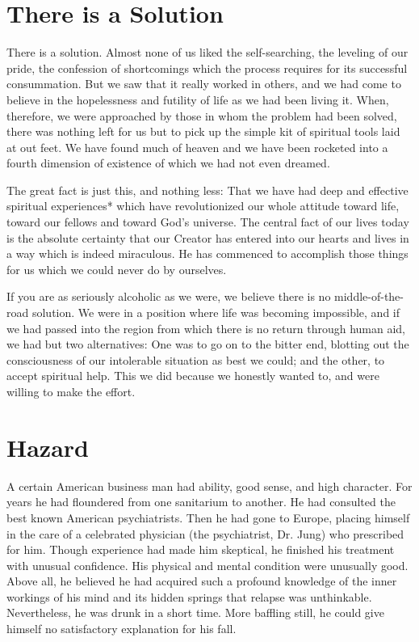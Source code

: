 \section{There is a Solution}

There is a solution. 
Almost none of us liked the self-searching, 
the leveling of our pride, the confession of shortcomings 
which the process requires for its successful consummation. 
But we saw that it really worked in others, 
and we had come to believe in the hopelessness and futility of life as we had been living it. 
When, therefore, we were approached by those in whom the problem had been solved, 
there was nothing left for us but to pick up the simple kit of spiritual tools laid at out feet. 
We have found much of heaven 
and we have been rocketed into a fourth dimension of existence of which we had not even dreamed.

The great fact is just this, and nothing less: 
That we have had deep and effective spiritual experiences* 
which have revolutionized our whole attitude toward life, 
toward our fellows 
and toward God's universe. 
The central fact of our lives today is the absolute certainty that our Creator has entered into our hearts and lives 
in a way which is indeed miraculous. 
He has commenced to accomplish those things for us which we could never do by ourselves.

If you are as seriously alcoholic as we were, we believe there is no middle-of-the-road solution. 
We were in a position where life was becoming impossible, 
and if we had passed into the region from which there is no return through human aid, we had but two alternatives: 
One was to go on to the bitter end, blotting out the consciousness of our intolerable situation as best we could; 
and the other, to accept spiritual help. 
This we did because we honestly wanted to, and were willing to make the effort.


\section{Hazard}

A certain American business man had ability, good sense, and high character. 
For years he had floundered from one sanitarium to another. 
He had consulted the best known American psychiatrists. 
Then he had gone to Europe, placing himself in the care of a celebrated physician (the psychiatrist, Dr. Jung) who prescribed for him. 
Though experience had made him skeptical, he finished his treatment with unusual confidence. 
His physical and mental condition were unusually good. 
Above all, he believed he had acquired such a profound knowledge of the inner workings of his mind and its hidden springs that relapse was unthinkable. 
Nevertheless, he was drunk in a short time. 
More baffling still, he could give himself no satisfactory explanation for his fall.

